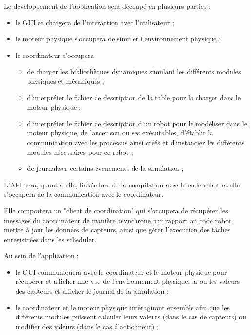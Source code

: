\label{architecture}

Le développement de l'application sera découpé en plusieurs parties :
\begin{itemize}
    \item le GUI se chargera de l'interaction avec l'utilisateur ;
    \item le moteur physique s'occupera de simuler l'environnement physique ;
    \item le coordinateur s'occupera :
    \begin{itemize}
        \item de charger les bibliothèques dynamiques simulant les différents modules physiques et mécaniques ;
        \item d'interpréter le fichier de description de la table pour la charger dans le moteur physique ;
        \item d'interpréter le fichier de description d'un robot pour le modéliser dans le moteur physique, de lancer son ou ses exécutables, d'établir la communication avec les processus ainsi créés et d'instancier les différents modules nécessaires pour ce robot ;
        \item de journaliser certains évenements de la simulation ;
    \end{itemize}
\end{itemize}

L'API sera, quant à elle, linkée lors de la compilation avec le code robot et elle s'occupera de la communication avec le coordinateur.

Elle comportera un "client de coordination" qui s'occupera de récupérer les messages du coordinateur de manière asynchrone par rapport au code robot, mettre à jour les données de capteurs, ainsi que gérer l'execution des tâches enregistrées dans les scheduler.

Au sein de l'application :
\begin{itemize}
    \item le GUI communiquera avec le coordinateur et le moteur physique pour récupérer et afficher une vue de l'environnement physique, la ou les valeurs des capteurs et afficher le journal de la simulation ;
    \item le coordinateur et le moteur physique intéragiront ensemble afin que les différents modules puissent calculer leurs valeurs (dans le cas de capteurs) ou modifier des valeurs (dans le cas d'actionneur) ;
\end{itemize}


